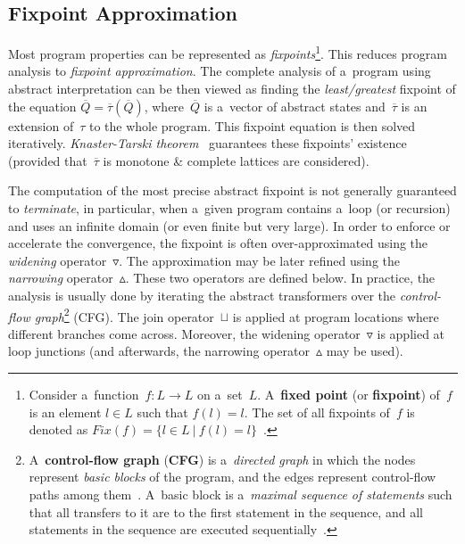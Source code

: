 \subsection{Fixpoint Approximation~\cite{AILatticeModelCousot, wideningNarrowingCousot, savAI, staticAnalysisMoller, programAnalysisNielson, staticAnalysisRival}}
\label{sec:AIFixpoints}

Most program properties can be represented as \emph{fixpoints}\footnote{Consider a~function~$ f : L \rightarrow L $ on a~set~$ L $. A~\textbf{fixed point} (or \textbf{fixpoint}) of~$ f $ is an element $ l \in L $ such that $ f(l) = l $. The set of all fixpoints of~$ f $ is denoted as $ Fix(f) = \{l \in L\ |\ f(l) = l\} $~\cite{programAnalysisNielson}.}. This reduces program analysis to \emph{fixpoint approximation}. The complete analysis of a~program using abstract interpretation can be then viewed as finding the \emph{least/greatest} fixpoint of the equation $ \overline{Q} = \overline{\tau}(\overline{Q}) $, where~$ \overline{Q} $ is a~vector of abstract states and~$ \overline{\tau} $ is an extension of~$ \tau $ to the whole program. This fixpoint equation is then solved iteratively. \emph{Knaster-Tarski theorem}~\cite{tarski} guarantees these fixpoints' existence (provided that~$ \overline{\tau} $ is monotone \& complete lattices are considered).

The computation of the most precise abstract fixpoint is not generally guaranteed to \emph{terminate}, in particular, when a~given program contains a~loop (or recursion) and uses an infinite domain (or even finite but very large). In order to enforce or accelerate the convergence, the fixpoint is often over-approximated using the \emph{widening} operator~$ \triangledown $. The approximation may be later refined using the \emph{narrowing} operator~$ \vartriangle $. These two operators are defined below. In practice, the analysis is usually done by iterating the abstract transformers over the \emph{control-flow graph}\footnote{A~\textbf{control-flow graph} (\textbf{CFG}) is a~\emph{directed graph} in which the nodes represent \emph{basic blocks} of the program, and the edges represent control-flow paths among them~\cite{controlFlowAnalysisAllen}. A~basic block is a~\emph{maximal sequence of statements} such that all transfers to it are to the first statement in the sequence, and all statements in the sequence are executed sequentially~\cite{programAnalysisNielson}.} (CFG). The join operator~$ \sqcup $ is applied at program locations where different branches come across. Moreover, the widening operator~$ \triangledown $ is applied at loop junctions (and afterwards, the narrowing operator~$ \vartriangle $ may be used).

